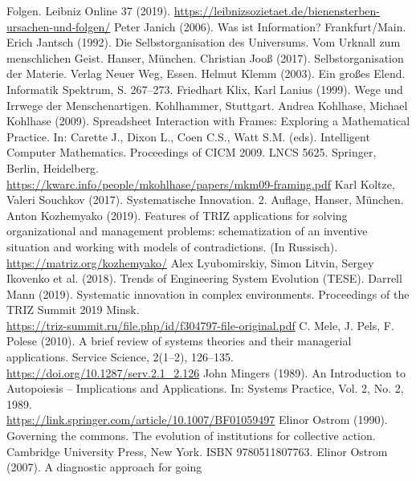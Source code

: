\documentclass[11pt,a4paper]{article}
\begin{document}
\begin{thebibliography}{xxx}
  Folgen.  Leibniz Online 37 (2019).
  \url{https://leibnizsozietaet.de/bienensterben-ursachen-und-folgen/}
 Peter Janich (2006). Was ist Information?
  Frankfurt/Main.
 Erich Jantsch (1992). Die Selbstorganisation des
  Universums. Vom Urknall zum menschlichen Geist.  Hanser, München.
 Christian Jooß (2017). Selbstorganisation der Materie.
  Verlag Neuer Weg, Essen.
 Helmut Klemm (2003). Ein großes Elend. Informatik
  Spektrum, S. 267--273.
 Friedhart Klix, Karl Lanius (1999). Wege und Irrwege der
  Menschenartigen.  Kohlhammer, Stuttgart.
 Andrea Kohlhase, Michael Kohlhase (2009). Spreadsheet
  Interaction with Frames: Exploring a Mathematical Practice. In: Carette J.,
  Dixon L., Coen C.S., Watt S.M. (eds). Intelligent Computer
  Mathematics. Proceedings of CICM 2009.  LNCS 5625. Springer, Berlin,
  Heidelberg.\\
  \url{https://kwarc.info/people/mkohlhase/papers/mkm09-framing.pdf}
 Karl Koltze, Valeri Souchkov (2017). Systematische
  Innovation.  2. Auf\-lage, Hanser, München.
 Anton Kozhemyako (2019). Features of TRIZ
  applications for solving organizational and management problems:
  schematization of an inventive situation and working with models of
  contradictions. (In Russisch).\\ \url{https://matriz.org/kozhemyako/}
 Alex Lyubomirskiy, Simon Litvin, Sergey Ikovenko et al.
  (2018).  Trends of Engineering System Evolution (TESE).
 Darrell Mann (2019).  Systematic innovation in complex
  environments. Proceedings of the TRIZ Summit 2019 Minsk.\\
  \url{https://triz-summit.ru/file.php/id/f304797-file-original.pdf} 
 C. Mele, J. Pels, F. Polese (2010). A brief review of
  systems theories and their managerial applications. Service Science,
  2(1--2), 126--135.\\ \url{https://doi.org/10.1287/serv.2.1_2.126} 
 John Mingers (1989). An Introduction to Autopoiesis --
  Implications and Applications. In: Systems Practice, Vol. 2, No. 2,
  1989.\\ \url{https://link.springer.com/article/10.1007/BF01059497}
 Elinor Ostrom (1990). Governing the commons. The
  evolution of institutions for collective action. Cambridge University Press,
  New York.  ISBN 9780511807763.
 Elinor Ostrom (2007). A diagnostic approach for going

\end{thebibliography}
\end{document}
